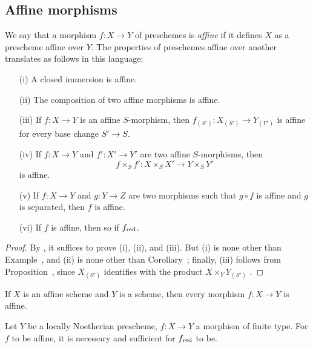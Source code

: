 \subsection{Affine morphisms}
\label{subsection:2.1.6}

\begin{env}[1.6.1]
\label{2.1.6.1}
We say that a morphism $f:X\to Y$ of preschemes is \emph{affine} if it defines $X$ as a prescheme affine over $Y$.
The properties of preschemes affine over another translates as follows in this language:
\end{env}

\begin{proposition}[1.6.2]
\label{2.1.6.2}
\medskip\noindent
\begin{enumerate}
  \item[{\rm(i)}] A closed immersion is affine.
  \item[{\rm(ii)}] The composition of two affine morphisms is affine.
  \item[{\rm(iii)}] If $f:X\to Y$ is an affine $S$-morphism, then $f_{(S')}:X_{(S')}\to Y_{(Y')}$ is affine for every base change $S'\to S$.
  \item[{\rm(iv)}] If $f:X\to Y$ and $f':X'\to Y'$ are two affine $S$-morphisms, then
    \[
      f\times_S f':X\times_S X'\to Y\times_S Y'
    \]
    is affine.
  \item[{\rm(v)}] If $f:X\to Y$ and $g:Y\to Z$ are two morphisms such that $g\circ f$ is affine and $g$ is separated, then $f$ is affine.
  \item[{\rm(vi)}] If $f$ is affine, then so if $f_{\mathrm{red}}$.
\end{enumerate}
\end{proposition}

\begin{proof}
\label{proof-2.1.6.2}
By , it suffices to prove (i), (ii), and (iii).
But (i) is none other than Example~, and (ii) is none other than Corollary~; finally, (iii) follows from Proposition~, since $X_{(S')}$ identifies with the product $X\times_Y Y_{(S')}$ .
\end{proof}

\begin{corollary}[1.6.3]
\label{2.1.6.3}
If $X$ is an affine scheme and $Y$ is a scheme, then every morphism $f:X\to Y$ is affine.
\end{corollary}

\begin{proposition}[1.6.4]
\label{2.1.6.4}
Let $Y$ be a locally Noetherian prescheme, $f:X\to Y$ a morphism of finite type.
For $f$ to be affine, it is necessary and sufficient for $f_{\mathrm{red}}$ to be.
\end{proposition}

